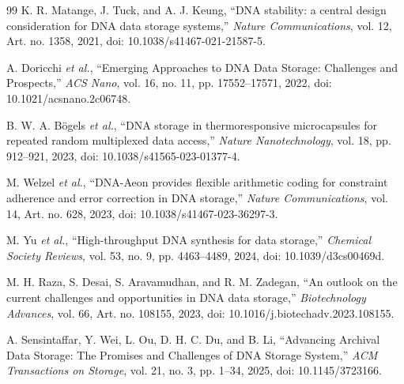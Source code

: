 \documentclass[conference]{IEEEtran}
\begin{document}
\begin{thebibliography}{99}
K. R. Matange, J. Tuck, and A. J. Keung, ``DNA stability: a central design consideration for DNA data storage systems,'' \emph{Nature Communications}, vol. 12, Art. no. 1358, 2021, doi: 10.1038/s41467-021-21587-5.

A. Doricchi \textit{et al.}, ``Emerging Approaches to DNA Data Storage: Challenges and Prospects,'' \emph{ACS Nano}, vol. 16, no. 11, pp. 17552--17571, 2022, doi: 10.1021/acsnano.2c06748.

B. W. A. B\"ogels \textit{et al.}, ``DNA storage in thermoresponsive microcapsules for repeated random multiplexed data access,'' \emph{Nature Nanotechnology}, vol. 18, pp. 912--921, 2023, doi: 10.1038/s41565-023-01377-4.

M. Welzel \textit{et al.}, ``DNA-Aeon provides flexible arithmetic coding for constraint adherence and error correction in DNA storage,'' \emph{Nature Communications}, vol. 14, Art. no. 628, 2023, doi: 10.1038/s41467-023-36297-3.

M. Yu \textit{et al.}, ``High-throughput DNA synthesis for data storage,'' \emph{Chemical Society Reviews}, vol. 53, no. 9, pp. 4463--4489, 2024, doi: 10.1039/d3cs00469d.

M. H. Raza, S. Desai, S. Aravamudhan, and R. M. Zadegan, ``An outlook on the current challenges and opportunities in DNA data storage,'' \emph{Biotechnology Advances}, vol. 66, Art. no. 108155, 2023, doi: 10.1016/j.biotechadv.2023.108155.

A. Sensintaffar, Y. Wei, L. Ou, D. H. C. Du, and B. Li, ``Advancing Archival Data Storage: The Promises and Challenges of DNA Storage System,'' \emph{ACM Transactions on Storage}, vol. 21, no. 3, pp. 1--34, 2025, doi: 10.1145/3723166.

\end{thebibliography}
\end{document}
